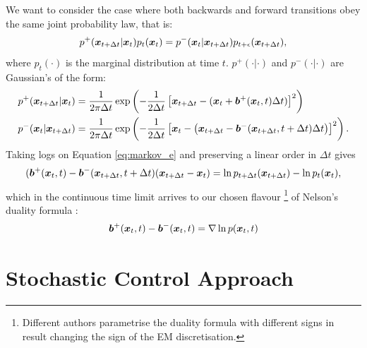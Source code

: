 \documentclass[a4paper,12pt,twoside,openright]{report}
\theoremstyle{definition}
\begin{document}
We want to consider the case where both backwards and forward transitions obey the same joint probability law, that is:
\begin{align}\label{eq:markov_e}
    p^{+}({\bm{x}}_{t+\Delta t}|{\bm{x}}_t)p_t({\bm{x}}_t)=p^{-}({\bm{x}}_t|{\bm{x}}_{t+\Delta t})p_{t+\epsilon}({\bm{x}}_{t+\Delta t}),
\end{align}
where $p_t(\cdot)$ is the marginal distribution at time $t$. $p^{+}(\cdot|\cdot)$ and $p^{-}(\cdot|\cdot)$ are Gaussian's of the form:
\begin{align*}
p^{+}({\bm{x}}_{t+\Delta t}|{\bm{x}}_t)&=\frac{1}{2\pi \Delta t }\exp\left(-\frac{1}{2\Delta t}\left[{\bm{x}}_{t+\Delta t}-({\bm{x}}_t+{\bm{b}}^{+}({\bm{x}}_t,t)\Delta t)\right]^2\right) \\
p^{-}({\bm{x}}_t|{\bm{x}}_{t+\Delta t})&=\frac{1}{2\pi \Delta t}\exp\left(-\frac{1}{2\Delta t}\left[{\bm{x}}_t-\left({\bm{x}}_{t+\Delta t}-{\bm{b}}^{-}({\bm{x}}_{t+\Delta t},t+\Delta t)\Delta t\right)\right]^2\right).
\end{align*}
Taking logs on Equation \ref{eq:markov_e} and preserving a linear order in $\Delta t$ gives
\begin{align*}
    ({\bm{b}}^+({\bm{x}}_t,t)-{\bm{b}}^-({\bm{x}}_{t+\Delta t},t+\Delta t)({\bm{x}}_{t+\Delta t}-{\bm{x}}_t)=\operatorname{ln} p_{t+\Delta t}({\bm{x}}_{t+\Delta t}) - \operatorname{ln} p_t({\bm{x}}_t), 
\end{align*}
which in the continuous time limit arrives to our chosen flavour \footnote{Different authors parametrise the duality formula with different signs in result changing the sign of the EM discretisation.} of Nelson's duality formula \citep{nelson1967dynamical}:
\begin{align*}
      {\bm{b}}^+({\bm{x}}_t,t) -{\bm{b}}^-({\bm{x}}_t,t) = \nabla\operatorname{ln} p({\bm{x}}_t, t)
\end{align*}

\section{Stochastic Control Approach}
\end{document}
